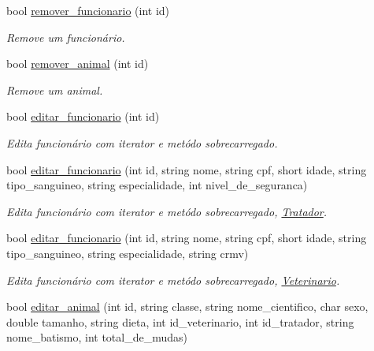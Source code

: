 \begin{DoxyCompactItemize}
bool \mbox{\hyperlink{class_sistema_a890a6f3c58e05fc38d372b270b2a3180}{remover\+\_\+funcionario}} (int id)
\begin{DoxyCompactList}\small\item\em Remove um funcionário. \end{DoxyCompactList}\item 
bool \mbox{\hyperlink{class_sistema_a05daf6b3c0d5c65627965eb9b331deac}{remover\+\_\+animal}} (int id)
\begin{DoxyCompactList}\small\item\em Remove um animal. \end{DoxyCompactList}\item 
\mbox{\label{class_sistema_a9d29640453a32705230b5e9b6db0cf9b}} 
bool \mbox{\hyperlink{class_sistema_a9d29640453a32705230b5e9b6db0cf9b}{editar\+\_\+funcionario}} (int id)
\begin{DoxyCompactList}\small\item\em Edita funcionário com iterator e metódo sobrecarregado. \end{DoxyCompactList}\item 
bool \mbox{\hyperlink{class_sistema_a820add3f6f6710ff817922b96b591765}{editar\+\_\+funcionario}} (int id, string nome, string cpf, short idade, string tipo\+\_\+sanguineo, string especialidade, int nivel\+\_\+de\+\_\+seguranca)
\begin{DoxyCompactList}\small\item\em Edita funcionário com iterator e metódo sobrecarregado, \mbox{\hyperlink{class_tratador}{Tratador}}. \end{DoxyCompactList}\item 
bool \mbox{\hyperlink{class_sistema_acbbe56ff28b53805edb16ec4a7cf0dd0}{editar\+\_\+funcionario}} (int id, string nome, string cpf, short idade, string tipo\+\_\+sanguineo, string especialidade, string crmv)
\begin{DoxyCompactList}\small\item\em Edita funcionário com iterator e metódo sobrecarregado, \mbox{\hyperlink{class_veterinario}{Veterinario}}. \end{DoxyCompactList}\item 
\mbox{\label{class_sistema_af3fddb7e612087f5f32d96da0ddef16b}} 
bool \mbox{\hyperlink{class_sistema_af3fddb7e612087f5f32d96da0ddef16b}{editar\+\_\+animal}} (int id, string classe, string nome\+\_\+cientifico, char sexo, double tamanho, string dieta, int id\+\_\+veterinario, int id\+\_\+tratador, string nome\+\_\+batismo, int total\+\_\+de\+\_\+mudas)

\end{DoxyCompactItemize}
